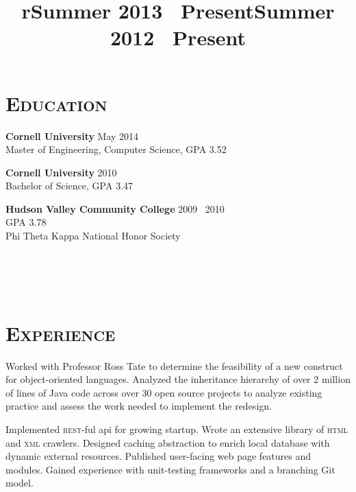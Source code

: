 \begin{resume}


\section{\textsc{Education}}

\textbf{Cornell University} \hfill May 2014 \\
Master of Engineering, Computer Science, GPA 3.52

\textbf{Cornell University} \hfill 2010 \\
Bachelor of Science, GPA 3.47%

\textbf{Hudson Valley Community College} \hfill 2009 \textendash\ 2010 \\ 
GPA 3.78\\
Phi Theta Kappa National Honor Society


\begin{formatb}
  \title{r}\\
  \\
  \body\\
\end{formatb}

\vfill

\section{\textsc{Experience}}

\title{Summer 2013 \textendash \ Present}
\location{}
\begin{position}
Worked with Professor Ross Tate to determine the feasibility of a new construct for object-oriented languages.
Analyzed the inheritance hierarchy of over 2 million of lines of Java code across over 30 open source projects to analyze existing practice and assess the work needed to implement the redesign.
\end{position}

\title{Summer 2012 \textendash\ Present}
\location{}
\begin{position}
Implemented \textsc{rest-}ful api for growing startup.
Wrote an extensive library of \textsc{html} and \textsc{xml} crawlers.
Designed caching abstraction to enrich local database with dynamic external resources.
Published user-facing web page features and modules.
Gained experience with unit-testing frameworks and a branching Git model.
\end{position}


\end{resume}
